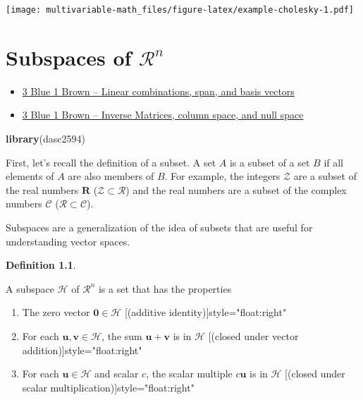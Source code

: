 \documentclass[
]{book}
\newenvironment{Shaded}{\begin{snugshade}}{\end{snugshade}}
\newcommand{\KeywordTok}[1]{\textcolor[rgb]{0.13,0.29,0.53}{\textbf{#1}}}
\newcommand{\NormalTok}[1]{#1}
\theoremstyle{definition}
\newtheorem{definition}{Definition}[chapter]
\theoremstyle{definition}
\theoremstyle{definition}
\theoremstyle{definition}
\theoremstyle{remark}
\begin{document}
\texttt{[image: multivariable-math\_files/figure-latex/example-cholesky-1.pdf]}

\hypertarget{subspaces-Rn}{%
\chapter{\texorpdfstring{Subspaces of \(\mathcal{R}^n\)}{Subspaces of \textbackslash mathcal\{R\}\^{}n}}\label{subspaces-Rn}}

\begin{itemize}
\item
  \href{https://www.3blue1brown.com/lessons/span}{3 Blue 1 Brown -- Linear combinations, span, and basis vectors}
\item
  \href{https://www.3blue1brown.com/lessons/inverse-matrices}{3 Blue 1 Brown -- Inverse Matrices, column space, and null space}
\end{itemize}

\begin{Shaded}
\begin{Highlighting}[]
\KeywordTok{library}\NormalTok{(dasc2594)}
\end{Highlighting}
\end{Shaded}

First, let's recall the definition of a subset. A set \(A\) is a subset of a set \(B\) if all elements of \(A\) are also members of \(B\). For example, the integers \(\mathcal{Z}\) are a subset of the real numbers \(\mathbf{R}\) (\(\mathcal{Z} \subset \mathcal{R}\)) and the real numbers are a subset of the complex numbers \(\mathcal{C}\) (\(\mathcal{R} \subset \mathcal{C}\)).

Subspaces are a generalization of the idea of subsets that are useful for understanding vector spaces.

\begin{definition}
\protect\hypertarget{def:subspace}{}\label{def:subspace}

A subspace \(\mathcal{H}\) of \(\mathcal{R}^n\) is a set that has the properties

\begin{enumerate}
\def\labelenumi{\arabic{enumi})}
\item
  The zero vector \(\mathbf{0} \in \mathcal{H}\) \hfill \hfill [(additive identity)]{style="float:right"}
\item
  For each \(\mathbf{u}, \mathbf{v} \in \mathcal{H}\), the sum \(\mathbf{u} + \mathbf{v}\) is in \(\mathcal{H}\) \hfill [(closed under vector addition)]{style="float:right"}
\item
  For each \(\mathbf{u} \in \mathcal{H}\) and scalar \(c\), the scalar multiple \(c \mathbf{u}\) is in \(\mathcal{H}\) \hfill [(closed under scalar multiplication)]{style="float:right"}
\end{enumerate}

\end{definition}
\end{document}
